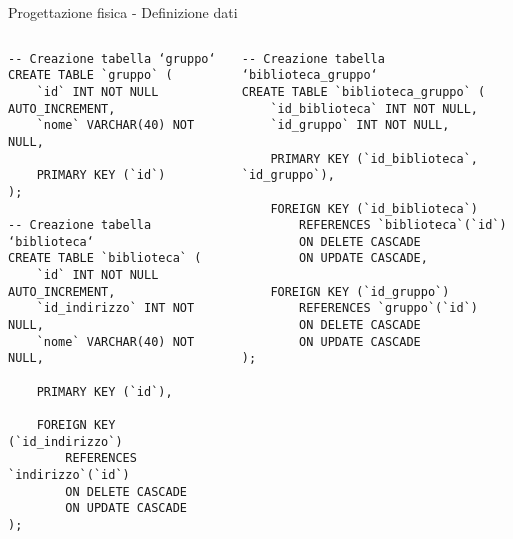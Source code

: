 \begin{frame}[fragile]{Progettazione fisica - Definizione dati}
    \begin{columns}[T]
        \begin{column}[T]{.45\textwidth}
            \begin{verbatim}
-- Creazione tabella ‘gruppo‘
CREATE TABLE `gruppo` (
    `id` INT NOT NULL AUTO_INCREMENT,
    `nome` VARCHAR(40) NOT NULL,

    PRIMARY KEY (`id`)
);

-- Creazione tabella ‘biblioteca‘
CREATE TABLE `biblioteca` (
    `id` INT NOT NULL AUTO_INCREMENT,
    `id_indirizzo` INT NOT NULL,
    `nome` VARCHAR(40) NOT NULL,

    PRIMARY KEY (`id`),

    FOREIGN KEY (`id_indirizzo`)
        REFERENCES `indirizzo`(`id`)
        ON DELETE CASCADE
        ON UPDATE CASCADE
);
            \end{verbatim}
        \end{column}
        \begin{column}[T]{.45\textwidth}
            \begin{verbatim}
-- Creazione tabella ‘biblioteca_gruppo‘
CREATE TABLE `biblioteca_gruppo` (
    `id_biblioteca` INT NOT NULL,
    `id_gruppo` INT NOT NULL,

    PRIMARY KEY (`id_biblioteca`, `id_gruppo`),
    
    FOREIGN KEY (`id_biblioteca`)
        REFERENCES `biblioteca`(`id`)
        ON DELETE CASCADE
        ON UPDATE CASCADE,

    FOREIGN KEY (`id_gruppo`)
        REFERENCES `gruppo`(`id`)
        ON DELETE CASCADE
        ON UPDATE CASCADE
);
            \end{verbatim}
        \end{column}
    \end{columns}
\end{frame}

